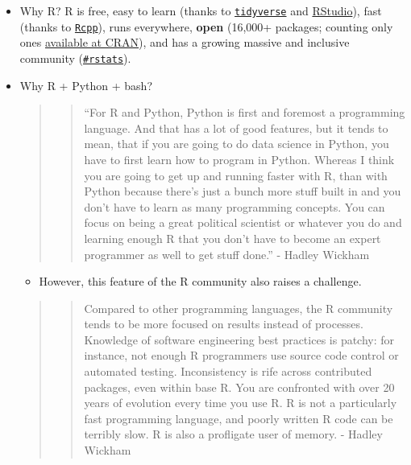 \documentclass[
]{book}
\providecommand{\tightlist}{%
  \setlength{\itemsep}{0pt}\setlength{\parskip}{0pt}}
\begin{document}
\begin{itemize}
\item
  Why R? R is free, easy to learn (thanks to \href{https://www.tidyverse.org/}{\texttt{tidyverse}} and \href{https://rstudio.com/}{RStudio}), fast (thanks to \href{https://cran.r-project.org/web/packages/Rcpp/index.html}{\texttt{Rcpp}}), runs everywhere, \textbf{open} (16,000+ packages; counting only ones \href{https://cran.r-project.org/web/packages/}{available at CRAN}), and has a growing massive and inclusive community (\href{https://twitter.com/search?q=\%23rstats\&src=typed_query}{\texttt{\#rstats}}).
\item
  Why R + Python + bash?

  \begin{quote}
  \begin{quote}
  ``For R and Python, Python is first and foremost a programming language. And that has a lot of good features, but it tends to mean, that if you are going to do data science in Python, you have to first learn how to program in Python. Whereas I think you are going to get up and running faster with R, than with Python because there's just a bunch more stuff built in and you don't have to learn as many programming concepts. You can focus on being a great political scientist or whatever you do and learning enough R that you don't have to become an expert programmer as well to get stuff done.'' - Hadley Wickham
  \end{quote}
  \end{quote}

  \begin{itemize}
  \tightlist
  \item
    However, this feature of the R community also raises a challenge.
  \end{itemize}

  \begin{quote}
  \begin{quote}
  Compared to other programming languages, the R community tends to be more focused on results instead of processes. Knowledge of software engineering best practices is patchy: for instance, not enough R programmers use source code control or automated testing. Inconsistency is rife across contributed packages, even within base R. You are confronted with over 20 years of evolution every time you use R. R is not a particularly fast programming language, and poorly written R code can be terribly slow. R is also a profligate user of memory. - Hadley Wickham
  \end{quote}
  \end{quote}


\end{itemize}
\end{document}
